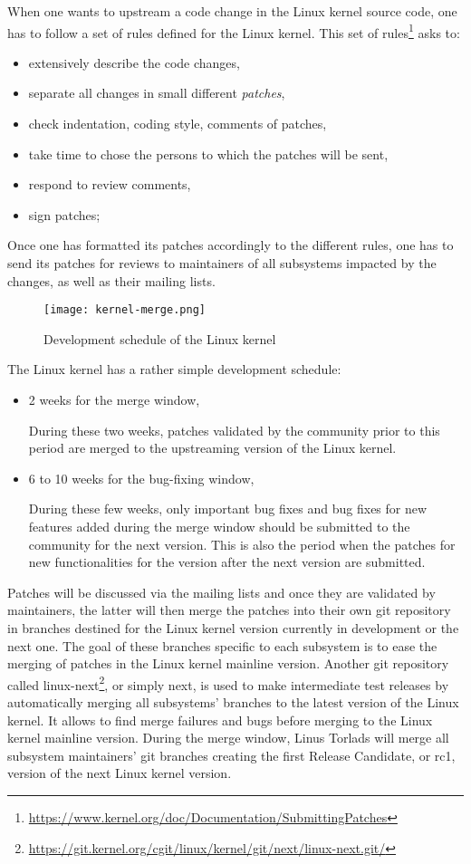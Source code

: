 When one wants to upstream a code change in the Linux kernel source code, one has to follow a set of rules defined for the Linux kernel. This set of rules\footnote{\url{https://www.kernel.org/doc/Documentation/SubmittingPatches}} asks to:
\begin{itemize}
  \item extensively describe the code changes,
  \item separate all changes in small different \textit{patches},
  \item check indentation, coding style, comments of patches,
  \item take time to chose the persons to which the patches will be sent,
  \item respond to review comments,
  \item sign patches;
\end{itemize}

Once one has formatted its patches accordingly to the different rules, one has to send its patches for reviews to maintainers of all subsystems impacted by the changes, as well as their mailing lists.

\begin{figure}[H]
  \texttt{[image: kernel-merge.png]}
  \caption{Development schedule of the Linux kernel}
\end{figure}

The Linux kernel has a rather simple development schedule:
\begin{itemize}
  \item 2 weeks for the merge window,

During these two weeks, patches validated by the community prior to this period are merged to the upstreaming version of the Linux kernel.

  \item 6 to 10 weeks for the bug-fixing window,

During these few weeks, only important bug fixes and bug fixes for new features added during the merge window should be submitted to the community for the next version. This is also the period when the patches for new functionalities for the version after the next version are submitted.
\end{itemize}

Patches will be discussed via the mailing lists and once they are validated by maintainers, the latter will then merge the patches into their own git repository in branches destined for the Linux kernel version currently in development or the next one. The goal of these branches specific to each subsystem is to ease the merging of patches in the Linux kernel mainline version. Another git repository called linux-next\footnote{\url{https://git.kernel.org/cgit/linux/kernel/git/next/linux-next.git/}}, or simply next, is used to make intermediate test releases by automatically merging all subsystems' branches to the latest version of the Linux kernel. It allows to find merge failures and bugs before merging to the Linux kernel mainline version. During the merge window, Linus Torlads will merge all subsystem maintainers' git branches creating the first Release Candidate, or rc1, version of the next Linux kernel version.

